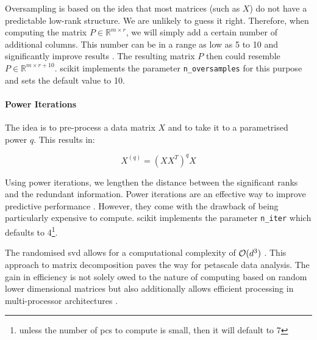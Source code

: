 Oversampling is based on the idea that most matrices (such as $X$) do not have a predictable low-rank structure.
We are unlikely to guess it right.
Therefore, when computing the matrix $P \in \mathbb{R}^{m \times r}$, we will simply add a certain number of additional columns.
This number can be in a range as low as 5 to 10 and significantly improve results \cite{martinsson2016randomized}.
The resulting matrix $P$ then could resemble $P \in \mathbb{R}^{m \times r+10}$.
\gls{scikit} implements the parameter \texttt{n\_oversamples} for this purpose and sets the default value to 10.



\paragraph{Power Iterations}

The idea is to pre-process a data matrix $X$ and to take it to a parametrised power $q$.
This results in:

\vspace{-4mm}
\begin{equation}
	\label{formula:powerIterations}
	X^{(q)} = (XX^T)^q X
\end{equation}

Using power iterations, we lengthen the distance between the significant ranks and the redundant information.
Power iterations are an effective way to improve predictive performance \cite{halko2011finding}.
However, they come with the drawback of being particularly expensive to compute.
\gls{scikit} implements the parameter \texttt{n\_iter} which defaults to 4\footnote{%
unless the number of \glspl{pc} to compute is small, then it will default to 7%
}.
\bigskip
\bigskip


The randomised \gls{svd} allows for a computational complexity of $\mathcal{O}(d^3)$ \cite{HandsOnMLCh8}.
This approach to matrix decomposition paves the way for petascale data analysis.
The gain in efficiency is not solely owed to the nature of computing based on random lower dimensional matrices but also additionally allows efficient processing in multi-processor architectures \cite{halko2011finding}.



\clearpage
